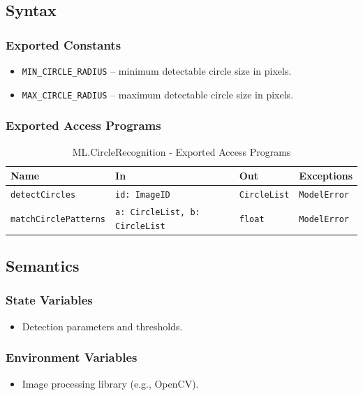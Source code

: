 \documentclass[12pt, titlepage]{article}
\begin{document}
\subsection{Syntax}

\subsubsection{Exported Constants}
\begin{itemize}
    \item \texttt{MIN\_CIRCLE\_RADIUS} – minimum detectable circle size in pixels.
    \item \texttt{MAX\_CIRCLE\_RADIUS} – maximum detectable circle size in pixels.
\end{itemize}

\subsubsection{Exported Access Programs}

\begin{table}[H]
\centering
\small
\caption{ML.CircleRecognition - Exported Access Programs}
\begin{tabular}{p{3.5cm} p{3.5cm} p{3.5cm} p{3.5cm}}
\toprule
\textbf{Name} & \textbf{In} & \textbf{Out} & \textbf{Exceptions} \\
\midrule
\texttt{detectCircles} & \texttt{id: ImageID} & \texttt{CircleList} & \texttt{ModelError} \\
\texttt{matchCirclePatterns} & \texttt{a: CircleList, b: CircleList} & \texttt{float} & \texttt{ModelError} \\
\bottomrule
\end{tabular}
\end{table}

\subsection{Semantics}

\subsubsection{State Variables}
\begin{itemize}
    \item Detection parameters and thresholds.
\end{itemize}

\subsubsection{Environment Variables}
\begin{itemize}
    \item Image processing library (e.g., OpenCV).
\end{itemize}
\end{document}
